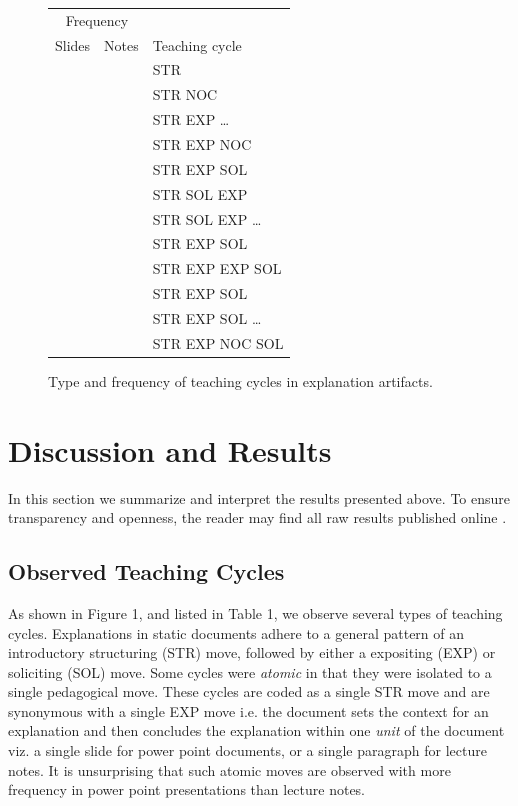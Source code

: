 \documentclass[conference]{IEEEtran}
\begin{document}
\newcommand{\Freq}[1]{\ensuremath{\text{Freq}_\text{#1}}}

\begin{figure}
\centering\footnotesize
\begin{tabular}{r|r|l}
\multicolumn{2}{c}{Frequency} & \\
\multicolumn{1}{c}{Slides}
  & \multicolumn{1}{c}{Notes}
  & \multicolumn{1}{l}{Teaching cycle} \\ \hline
& & STR \\
& & STR NOC \\
& & STR EXP \ldots \\
& & STR EXP NOC \\
& & STR EXP SOL \\
& & STR SOL EXP \\
& & STR SOL EXP \ldots \\
& & STR EXP SOL \\
& & STR EXP EXP SOL \\
& & STR EXP SOL \\
& & STR EXP SOL \ldots \\
& & STR EXP NOC SOL \\
\end{tabular}
\caption{Type and frequency of teaching cycles in explanation artifacts.}
\label{fig:cycles-table}
\end{figure}

\section{Discussion and Results}
In this section we summarize and interpret the results presented above. To
ensure transparency and openness, the reader may find all raw results published
online .

\subsection{Observed Teaching Cycles}
As shown in Figure 1, and listed in Table 1, we observe several types of
teaching cycles. Explanations in static documents adhere to a general pattern of
an introductory structuring (STR) move, followed by either a expositing (EXP) or
soliciting (SOL) move. Some cycles were \emph{atomic} in that they were isolated
to a single pedagogical move. These cycles are coded as a single STR move and
are synonymous with a single EXP move i.e. the document sets the context for an
explanation and then concludes the explanation within one \emph{unit} of the
document viz. a single slide for power point documents, or a single paragraph
for lecture notes. It is unsurprising that such atomic moves are observed with
more frequency in power point presentations than lecture notes. 
\end{document}
